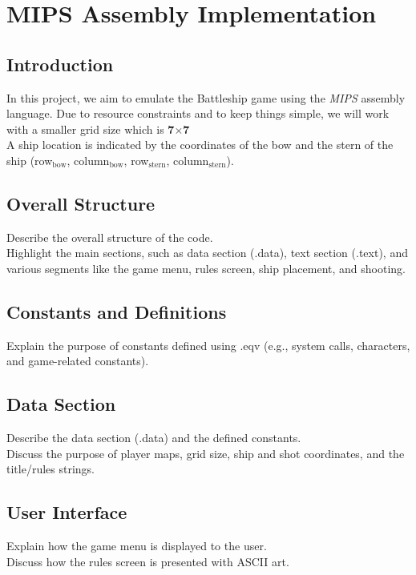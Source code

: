 \section{MIPS Assembly Implementation}
\subsection{Introduction}
\qquad In this project, we aim to emulate the Battleship game using the \textit{MIPS} assembly language. Due to resource constraints and to keep things simple, we will work with a smaller grid size which is \textbf{7$\times$7}\\

\qquad A ship location is indicated by the
coordinates of the bow and the stern of the ship (row$_{\text{bow}}$, column$_{\text{bow}}$, row$_{\text{stern}}$, column$_{\text{stern}}$).

\subsection{Overall Structure}
Describe the overall structure of the code.\\

Highlight the main sections, such as data section (.data), text section (.text), and various segments like the game menu, rules screen, ship placement, and shooting.

\subsection{Constants and Definitions}
Explain the purpose of constants defined using .eqv (e.g., system calls, characters, and game-related constants).

\subsection{Data Section}
Describe the data section (.data) and the defined constants.\\

Discuss the purpose of player maps, grid size, ship and shot coordinates, and the title/rules strings.

\subsection{User Interface}
Explain how the game menu is displayed to the user.\\

Discuss how the rules screen is presented with ASCII art.

